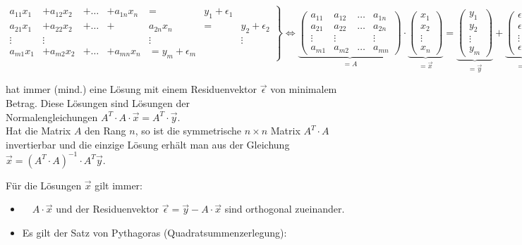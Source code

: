 \documentclass[10pt]{article}
\begin{document}
$$
\left.\begin{array}{ccccccc}
a_{11} x_{1} & +a_{12} x_{2} & +\ldots & +a_{1 n} x_{n} & = & y_{1}+\epsilon_{1} \\
a_{21} x_{1} & +a_{22} x_{2} & +\ldots & + & a_{2 n} x_{n} & = & y_{2}+\epsilon_{2} \\
\vdots & \vdots & & & \vdots & & \vdots \\
a_{m 1} x_{1} & +a_{m 2} x_{2} & +\ldots & +a_{m n} x_{n} & =y_{m}+\epsilon_{m}
\end{array}\right\} \Leftrightarrow \underbrace{\left(\begin{array}{cccc}
a_{11} & a_{12} & \ldots & a_{1 n} \\
a_{21} & a_{22} & \ldots & a_{2 n} \\
\vdots & \vdots & & \vdots \\
a_{m 1} & a_{m 2} & \ldots & a_{m n}
\end{array}\right)}_{=A} \cdot \underbrace{\left(\begin{array}{c}
x_{1} \\
x_{2} \\
\vdots \\
x_{n}
\end{array}\right)}_{=\vec{x}}=\underbrace{\left(\begin{array}{c}
y_{1} \\
y_{2} \\
\vdots \\
y_{m}
\end{array}\right)}_{=\vec{y}}+\underbrace{\left(\begin{array}{c}
\epsilon_{1} \\
\epsilon_{2} \\
\vdots \\
\epsilon_{m}
\end{array}\right)}_{=\vec{\epsilon}}
$$

hat immer (mind.) eine Lösung mit einem Residuenvektor $\vec{\epsilon}$ von minimalem Betrag. Diese Lösungen sind Lösungen der\\
Normalengleichungen $A^{T} \cdot A \cdot \vec{x}=A^{T} \cdot \vec{y}$.\\
Hat die Matrix $A$ den Rang $n$, so ist die symmetrische $n \times n$ Matrix $A^{T} \cdot A$ invertierbar und die einzige Lösung erhält man aus der Gleichung $\vec{x}=\left(A^{T} \cdot A\right)^{-1} \cdot A^{T} \vec{y}$.

Für die Lösungen $\vec{x}$ gilt immer:

\begin{itemize}
  \item $\quad A \cdot \vec{x}$ und der Residuenvektor $\vec{\epsilon}=\vec{y}-A \cdot \vec{x}$ sind orthogonal zueinander.
  \item Es gilt der Satz von Pythagoras (Quadratsummenzerlegung):
\end{itemize}
\end{document}
